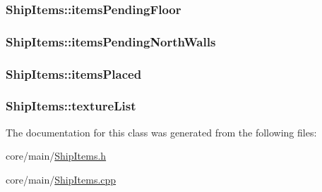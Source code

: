 \hypertarget{classShipItems_a0001695d214b41ca614297329504f46e}{
\subsubsection[{items\-Pending\-Floor}]{ Ship\-Items\-::items\-Pending\-Floor}}\label{classShipItems_a0001695d214b41ca614297329504f46e}
\hypertarget{classShipItems_ad5d679f77e2cd8eba65fdac2dcf814ab}{
\subsubsection[{items\-Pending\-North\-Walls}]{ Ship\-Items\-::items\-Pending\-North\-Walls}}\label{classShipItems_ad5d679f77e2cd8eba65fdac2dcf814ab}
\hypertarget{classShipItems_a3e71d1f18d3eee132394a9c524cb43e4}{
\subsubsection[{items\-Placed}]{ Ship\-Items\-::items\-Placed}}\label{classShipItems_a3e71d1f18d3eee132394a9c524cb43e4}
\hypertarget{classShipItems_adb0d04e59dc21442a04199a6d0043011}{
\subsubsection[{texture\-List}]{ Ship\-Items\-::texture\-List}}\label{classShipItems_adb0d04e59dc21442a04199a6d0043011}


The documentation for this class was generated from the following files\-:\begin{DoxyCompactItemize}
\item 
core/main/\hyperlink{ShipItems_8h}{Ship\-Items.\-h}\item 
core/main/\hyperlink{ShipItems_8cpp}{Ship\-Items.\-cpp}\end{DoxyCompactItemize}
